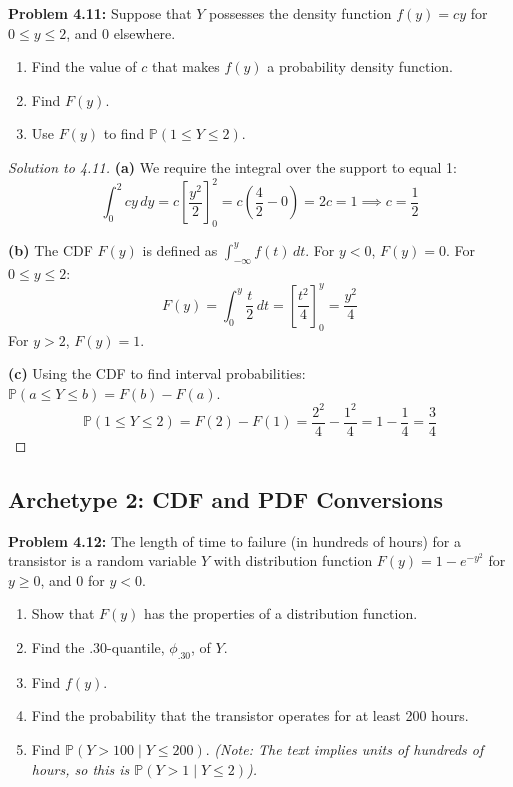 \documentclass[11pt, a4paper]{article}
\theoremstyle{definition}
\theoremstyle{remark}
\newcommand{\Prob}{\mathbb{P}}
\begin{document}
\textbf{Problem 4.11:} Suppose that $Y$ possesses the density function $f(y) = cy$ for $0 \le y \le 2$, and $0$ elsewhere.
\begin{enumerate}[label=\alph*)]
    \item Find the value of $c$ that makes $f(y)$ a probability density function.
    \item Find $F(y)$.
    \item Use $F(y)$ to find $\Prob(1 \le Y \le 2)$.
\end{enumerate}

\begin{proof}[Solution to 4.11]
\textbf{(a)} We require the integral over the support to equal 1:
\[ \int_{0}^{2} cy \, dy = c \left[ \frac{y^2}{2} \right]_{0}^{2} = c \left( \frac{4}{2} - 0 \right) = 2c = 1 \implies c = \frac{1}{2} \]

\textbf{(b)} The CDF $F(y)$ is defined as $\int_{-\infty}^{y} f(t) \, dt$.
For $y < 0$, $F(y) = 0$.
For $0 \le y \le 2$:
\[ F(y) = \int_{0}^{y} \frac{t}{2} \, dt = \left[ \frac{t^2}{4} \right]_{0}^{y} = \frac{y^2}{4} \]
For $y > 2$, $F(y) = 1$.

\textbf{(c)} Using the CDF to find interval probabilities: $\Prob(a \le Y \le b) = F(b) - F(a)$.
\[ \Prob(1 \le Y \le 2) = F(2) - F(1) = \frac{2^2}{4} - \frac{1^2}{4} = 1 - \frac{1}{4} = \frac{3}{4} \]
\end{proof}

\subsection{Archetype 2: CDF and PDF Conversions}

\textbf{Problem 4.12:} The length of time to failure (in hundreds of hours) for a transistor is a random variable $Y$ with distribution function $F(y) = 1 - e^{-y^2}$ for $y \ge 0$, and $0$ for $y < 0$.
\begin{enumerate}[label=\alph*)]
    \item Show that $F(y)$ has the properties of a distribution function.
    \item Find the $.30$-quantile, $\phi_{.30}$, of $Y$.
    \item Find $f(y)$.
    \item Find the probability that the transistor operates for at least 200 hours.
    \item Find $\Prob(Y > 100 \mid Y \le 200)$. \textit{(Note: The text implies units of hundreds of hours, so this is $\Prob(Y > 1 \mid Y \le 2)$).}
\end{enumerate}
\end{document}
